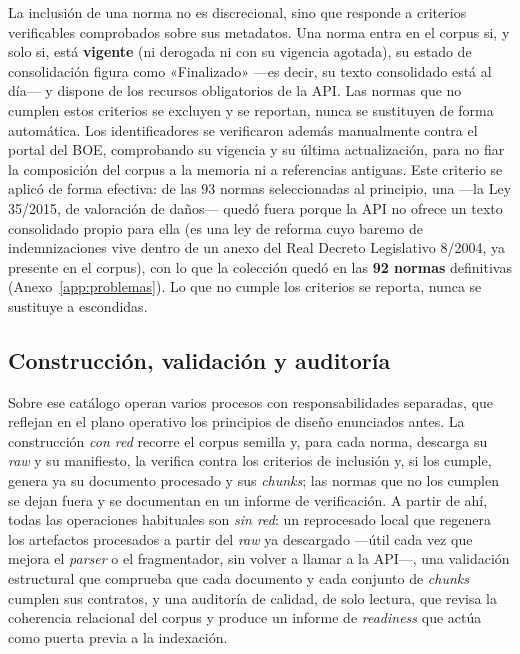 La inclusión de una norma no es discrecional, sino que responde a criterios verificables comprobados sobre sus metadatos. Una norma entra en el corpus si, y solo si, está \textbf{vigente} (ni derogada ni con su vigencia agotada), su estado de consolidación figura como «Finalizado» —es decir, su texto consolidado está al día— y dispone de los recursos obligatorios de la API. Las normas que no cumplen estos criterios se excluyen y se reportan, nunca se sustituyen de forma automática. Los identificadores se verificaron además manualmente contra el portal del BOE, comprobando su vigencia y su última actualización, para no fiar la composición del corpus a la memoria ni a referencias antiguas. Este criterio se aplicó de forma efectiva: de las 93 normas seleccionadas al principio, una —la Ley 35/2015, de valoración de daños— quedó fuera porque la API no ofrece un texto consolidado propio para ella (es una ley de reforma cuyo baremo de indemnizaciones vive dentro de un anexo del Real Decreto Legislativo 8/2004, ya presente en el corpus), con lo que la colección quedó en las \textbf{92 normas} definitivas (Anexo~\ref{app:problemas}). Lo que no cumple los criterios se reporta, nunca se sustituye a escondidas.

\subsection{Construcción, validación y auditoría}
\label{subsec:construccion-validacion}

Sobre ese catálogo operan varios procesos con responsabilidades separadas, que reflejan en el plano operativo los principios de diseño enunciados antes. La construcción \emph{con red} recorre el corpus semilla y, para cada norma, descarga su \emph{raw} y su manifiesto, la verifica contra los criterios de inclusión y, si los cumple, genera ya su documento procesado y sus \emph{chunks}; las normas que no los cumplen se dejan fuera y se documentan en un informe de verificación. A partir de ahí, todas las operaciones habituales son \emph{sin red}: un reprocesado local que regenera los artefactos procesados a partir del \emph{raw} ya descargado —útil cada vez que mejora el \emph{parser} o el fragmentador, sin volver a llamar a la API—, una validación estructural que comprueba que cada documento y cada conjunto de \emph{chunks} cumplen sus contratos, y una auditoría de calidad, de solo lectura, que revisa la coherencia relacional del corpus y produce un informe de \emph{readiness} que actúa como puerta previa a la indexación.

